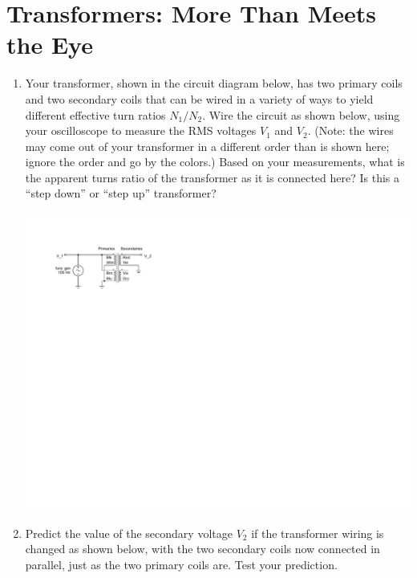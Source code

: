 \section{Transformers: More Than Meets the Eye}
\label{lab_transformers}


\bigskip

\begin{enumerate}[wide]

\item Your transformer, shown in the circuit diagram below, has two primary coils and two secondary coils that can be wired in a variety of ways to yield different effective turn ratios $N_1/N_2$.  Wire the circuit as shown below, using your oscilloscope to measure the RMS voltages $V_1$ and $V_2$.  (Note: the wires may come out of your transformer in a different order than is shown here; ignore the order and go by the colors.)  Based on your measurements, what is the apparent turns ratio of the transformer as it is connected here?  Is this a ``step down'' or ``step up'' transformer?  

\begin{center}
\includegraphics{transformers/transformer_par_single.pdf}
\end{center}

\item Predict the value of the secondary voltage $V_2$ if the transformer wiring is changed as shown below, with the two secondary coils now connected in parallel, just as the two primary coils are.  Test your prediction.


\end{enumerate}
